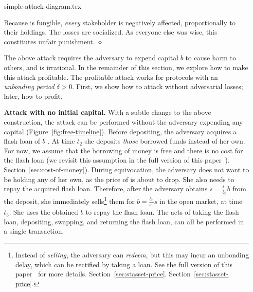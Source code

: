 \iflncs
  {simple-attack-diagram.tex}
\fi

Because \stasset is fungible, \emph{every} stakeholder is negatively affected,
proportionally to their holdings.
The losses are socialized. As everyone else was
wise, this constitutes unfair punishment.
\hfill
$\diamond$


The above attack requires the adversary to expend capital $b$ to cause
harm to others, and is irrational. In the remainder of this section, we
explore how to make this attack profitable. The profitable attack works
for protocols with an \emph{unbonding period} $\delta > 0$. First, we show
how to attack without adversarial losses; later, how to profit.

\noindent
\textbf{Attack with no initial capital.}
With a subtle change to the above construction, the attack can be
performed without the adversary expending any capital (Figure~\ref{fig:free-timeline}).
Before depositing, the
adversary acquires a flash loan of $b$ \asset. At time $t_2$ she deposits \emph{those}
borrowed funds instead of her own.
For now, we assume that the borrowing of money is free
and there is no cost for the flash loan
(we revisit this assumption in
\ifproceedings
  the full version of this paper~\cite{liquid-staking-eprint}).
\else
  Section~\ref{sec:cost-of-money}).
\fi
During equivocation, the adversary does not want to be holding any
\stasset of her own, as the price of \stasset is about to drop. She also
needs to repay the acquired flash loan.
Therefore, after the adversary obtains $s = \frac{s_0}{b_0} b$ \stasset
from the deposit, she immediately sells\footnote{Instead of \emph{selling}, the
adversary can \emph{redeem}, but this may incur an unbonding delay, which can
be rectified by taking a loan. See
\ifproceedings
  the full version of this paper~\cite{liquid-staking-eprint} for more details.
\else
  Section~\ref{sec:stasset-price}.
  Section~\ref{sec:stasset-price}.
\fi
}
them for $b = \frac{b_0}{s_0} s$ \asset in the open market, at time $t_3$.
She uses the obtained $b$ \asset to
repay the flash loan.
The acts of taking the flash loan,
depositing, swapping, and returning the flash loan,
can all be performed in a single transaction.

